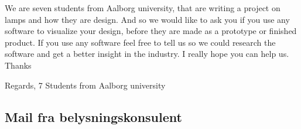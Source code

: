    
  We are seven students from Aalborg university, that are writing a project on lamps and how they are design. And so we would like to ask you if you use any software to visualize your design, before they are made as a prototype or finished product. If you use any software feel free to tell us so we could research the software and get a better insight in the industry. I really hope you can help us. Thanks
   
   
  Regards,
  7 Students from Aalborg university
  
\subsection{Mail fra belysningskonsulent}
\label{sec:mailbelysning}

